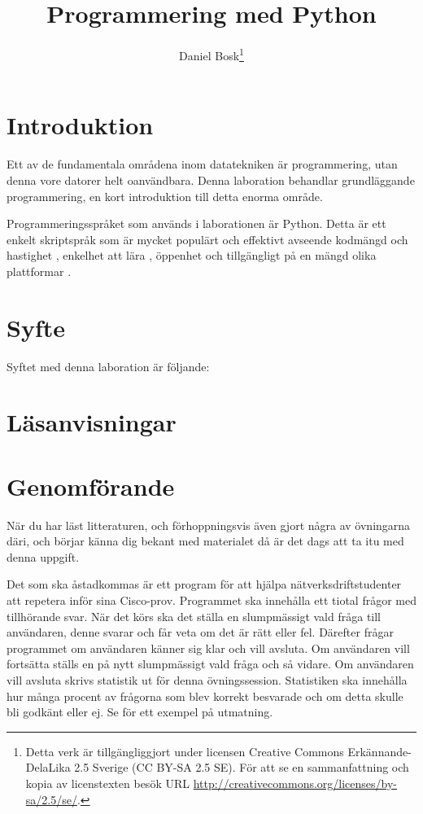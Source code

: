 \documentclass[a4paper]{miunasgn}
\title{Programmering med Python}
\author{
  Daniel Bosk\footnote{%
    Detta verk är tillgängliggjort under licensen Creative Commons 
    Erkännande-DelaLika 2.5 Sverige (CC BY-SA 2.5 SE).
    För att se en sammanfattning och kopia av licenstexten besök URL 
    \url{http://creativecommons.org/licenses/by-sa/2.5/se/}.
  }
}
\date{\svnId}
\begin{document}
\maketitle
\thispagestyle{foot}
\tableofcontents

\section{Introduktion}
\label{sec:intro}
Ett av de fundamentala områdena inom datatekniken är programmering, utan denna 
vore datorer helt oanvändbara.
Denna laboration behandlar grundläggande programmering, en kort introduktion 
till detta enorma område.

Programmeringsspråket som används i laborationen är Python.
Detta är ett enkelt skriptspråk som är mycket populärt \cite{PythonWeb} och 
effektivt avseende kodmängd och hastighet \cite{PythonWeb,Shootout}, enkelhet 
att lära \cite{PythonWeb,grandell2006complicate}, öppenhet och tillgängligt på 
en mängd olika plattformar \cite{PythonWeb}.


\section{Syfte}
\label{sec:aim}
Syftet med denna laboration är följande:
\begin{itemize}
  
\end{itemize}


\section{Läsanvisningar}
\label{sec:reading}



\section{Genomförande}
\label{sec:work}
När du har läst litteraturen, och förhoppningsvis även gjort några av 
övningarna däri, och börjar känna dig bekant med materialet då är det dags att 
ta itu med denna uppgift.

Det som ska åstadkommas är ett program för att hjälpa nätverksdriftstudenter 
att repetera inför sina Cisco-prov.
Programmet ska innehålla ett tiotal frågor med tillhörande svar.
När det körs ska det ställa en slumpmässigt vald fråga till användaren, denne 
svarar och får veta om det är rätt eller fel.
Därefter frågar programmet om användaren känner sig klar och vill 
avsluta.
Om användaren vill fortsätta ställs en på nytt slumpmässigt vald fråga och så 
vidare.
Om användaren vill avsluta skrivs statistik ut för denna övningssession.
Statistiken ska innehålla hur många procent av frågorna som blev korrekt 
besvarade och om detta skulle bli godkänt eller ej.
Se  för ett exempel på utmatning.
\end{document}

